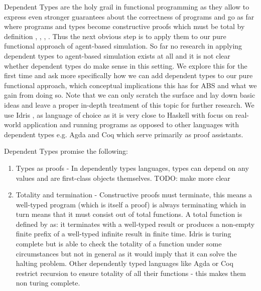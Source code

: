 Dependent Types are the holy grail in functional programming as they allow to express even stronger guarantees about the correctness of programs and go as far where programs and types become constructive proofs \cite{wadler_propositions_2015} which must be total by definition \cite{thompson_type_1991}, \cite{altenkirch_why_2005}, \cite{altenkirch_pi_sigma:_2010}, \cite{program_homotopy_2013}. Thus the next obvious step is to apply them to our pure functional approach of agent-based simulation. So far no research in applying dependent types to agent-based simulation exists at all and it is not clear whether dependent types do make sense in this setting. We explore this for the first time and ask more specifically how we can add dependent types to our pure functional approach, which conceptual implications this has for ABS and what we gain from doing so. Note that we can only scratch the surface and lay down basic ideas and leave a proper in-depth treatment of this topic for further research. We use Idris \cite{brady_idris_2013}, \cite{brady_type-driven_2017} as language of choice as it is very close to Haskell with focus on real-world application and running programs as opposed to other languages with dependent types e.g. Agda and Coq which serve primarily as proof assistants.

Dependent Types promise the following:

\begin{enumerate}
	\item Types as proofs - In dependently types languages, types can depend on any values and are first-class objects themselves. TODO: make more clear

	\item Totality and termination - Constructive proofs must terminate, this means a well-typed program (which is itself a proof) is always terminating which in turn means that it must consist out of total functions. A total function is defined by \cite{brady_type-driven_2017} as: it terminates with a well-typed result or produces a non-empty finite prefix of a well-typed infinite result in finite time. Idris is turing complete but is able to check the totality of a function under some circumstances but not in general as it would imply that it can solve the halting problem. Other dependently typed languages like Agda or Coq restrict recursion to ensure totality of all their functions - this makes them non turing complete.
\end{enumerate}


